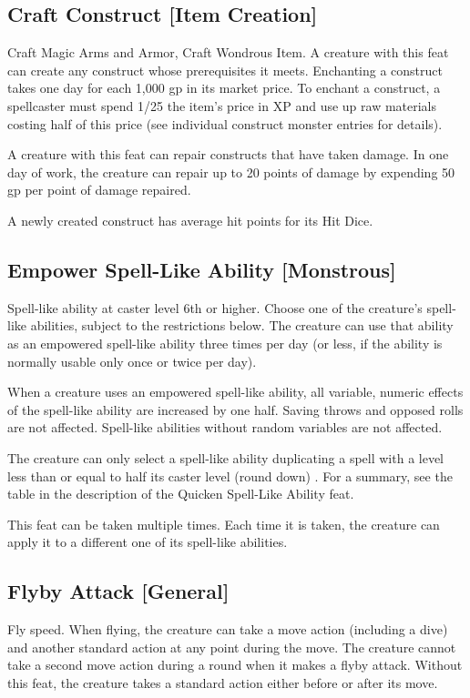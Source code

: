 \subsection{Craft Construct [Item Creation]}
 Craft Magic Arms and Armor, Craft Wondrous Item.
 A creature with this feat can create any construct whose prerequisites it meets. Enchanting a construct takes one day for each 1,000 gp in its market price. To enchant a construct, a spellcaster must spend 1/25 the item's price in XP and use up raw materials costing half of this price (see individual construct monster entries for details).

A creature with this feat can repair constructs that have taken damage. In one day of work, the creature can repair up to 20 points of damage by expending 50 gp per point of damage repaired.

A newly created construct has average hit points for its Hit Dice.

\subsection{Empower Spell-Like Ability [Monstrous]}
 Spell-like ability at caster level 6th or higher.
 Choose one of the creature's spell-like abilities, subject to the restrictions below. The creature can use that ability as an empowered spell-like ability three times per day (or less, if the ability is normally usable only once or twice per day).

When a creature uses an empowered spell-like ability, all variable, numeric effects of the spell-like ability are increased by one half. Saving throws and opposed rolls are not affected. Spell-like abilities without random variables are not affected.

The creature can only select a spell-like ability duplicating a spell with a level less than or equal to half its caster level (round down) . For a summary, see the table in the description of the Quicken Spell-Like Ability feat. 

 This feat can be taken multiple times. Each time it is taken, the creature can apply it to a different one of its spell-like abilities.

\subsection{Flyby Attack [General]}
 Fly speed.
 When flying, the creature can take a move action (including a dive) and another standard action at any point during the move. The creature cannot take a second move action during a round when it makes a flyby attack.
 Without this feat, the creature takes a standard action either before or after its move.

